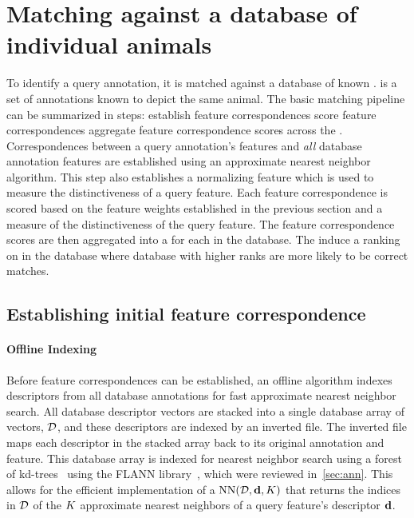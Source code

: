 \section{Matching against a database of individual animals}\label{sec:baselineranking}

    To identify a query annotation, it is matched against a database of known \names{}.
    \Aan{\name{}} is a set of annotations known to depict the same animal.
    The basic matching pipeline can be summarized in \three{} steps:
    establish feature correspondences \rpipe{} %
    score feature correspondences \rpipe{} %
    aggregate feature correspondence scores across the \names{}.
    Correspondences between a query annotation's features and \emph{all} database annotation features are
      established using an approximate nearest neighbor algorithm.
    This step also establishes a normalizing feature which is used to measure the distinctiveness of a query
      feature.
    Each feature correspondence is scored based on the feature weights established in the previous section and a
      measure of the distinctiveness of the query feature.
    The feature correspondence scores are then aggregated into a \glossterm{\namescore{}} for each \name{} in the
      database.
    The \namescores{} induce a ranking on \names{} in the database where database \names{} with higher ranks are
      more likely to be correct matches.

   \subsection{Establishing initial feature correspondence}\label{sub:featmatch}

        \paragraph{Offline Indexing}
            Before feature correspondences can be established, an offline algorithm indexes descriptors from all
              database annotations for fast approximate nearest neighbor search.
            All database descriptor vectors are stacked into a single database array of vectors, %
            $\mathcal{D}$, %
            and these descriptors are indexed by an inverted file.
            The inverted file maps each descriptor in the stacked array back to its original annotation and
              feature.
            This database array is indexed for nearest neighbor search using a forest of
              kd-trees~\cite{silpa_anan_optimised_2008} using the FLANN library~\cite{muja_fast_2009}, which were
              reviewed in~\cref{sec:ann}.
            This allows for the efficient implementation of a   %
            $\operatorname{NN}(\mathcal{D}, \mathbf{d}, K)$  %
            that returns the indices in $\mathcal{D}$ of the $K$ approximate nearest neighbors of a query feature's
              descriptor $\mathbf{d}$.

